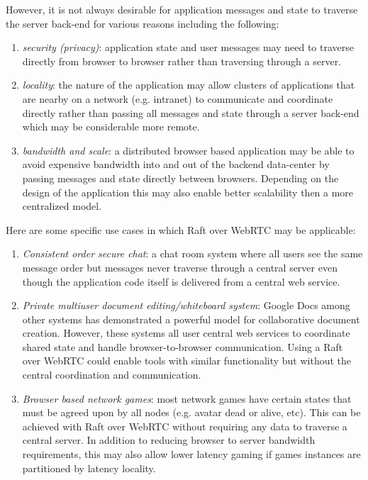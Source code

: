 \documentclass{acmtog} %
\begin{document}
However, it is not always desirable for application messages and state
to traverse the server back-end for various reasons including the
following:

\begin{enumerate}
\item \emph{security (privacy)}: application state and user messages may need to traverse directly from browser to browser rather than traversing through a server.
\item \emph{locality}: the nature of the application may allow clusters of applications that are nearby on a network (e.g. intranet) to communicate and coordinate directly rather than passing all messages and state through a server back-end which may be considerable more remote.
\item \emph{bandwidth and scale}: a distributed browser based application may be able to avoid expensive bandwidth into and out of the backend data-center by passing messages and state directly between browsers.  Depending on the design of the application this may also enable better scalability then a more centralized model.
\end{enumerate}

Here are some specific use cases in which Raft over WebRTC may be
applicable:

\begin{enumerate}
\item \emph{Consistent order secure chat}: a chat room system where all users see the same message order but messages never traverse through a central server even though the application code itself is delivered from a central web service.
\item \emph{Private multiuser document editing/whiteboard system}: Google Docs among other systems has demonstrated a powerful model for collaborative document creation. However, these systems all user central web services to coordinate shared state and handle browser-to-browser communication. Using a Raft over WebRTC could enable tools with similar functionality but without the central coordination and communication.
\item \emph{Browser based network games}: most network games have certain states that must be agreed upon by all nodes (e.g. avatar dead or alive, etc). This can be achieved with Raft over WebRTC without requiring any data to traverse a central server. In addition to reducing browser to server bandwidth requirements, this may also allow lower latency gaming if games instances are partitioned by latency locality.
\end{enumerate}
\end{document}
